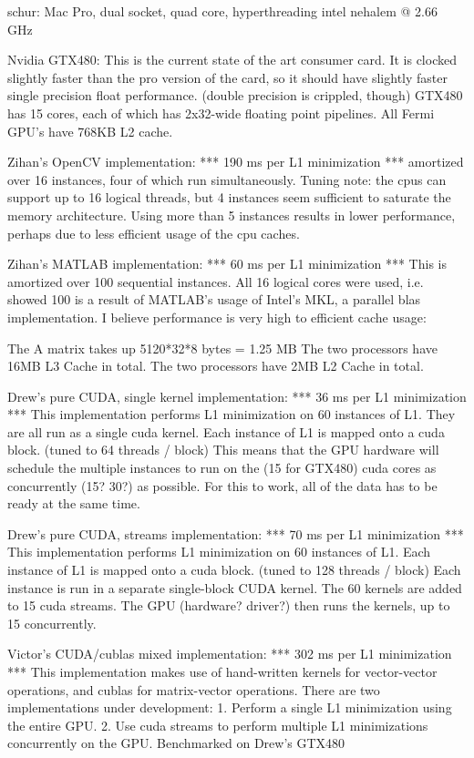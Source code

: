 \documentclass[10pt,twocolumn,letterpaper]{article}
\begin{document}
schur:  Mac Pro, dual socket, quad core, hyperthreading intel nehalem @ 2.66 GHz

Nvidia GTX480: This is the current state of the art consumer card.  
It is clocked slightly faster than the pro version of the card, so it 
should have slightly faster single precision float performance. (double precision is crippled, though)
GTX480 has 15 cores, each of which has 2x32-wide floating point pipelines.
All Fermi GPU's have 768KB L2 cache.

Zihan's OpenCV implementation: *** 190 ms per L1 minimization ***
amortized over 16 instances,
four of which run simultaneously.  Tuning note:  the cpus
can support up to 16 logical threads, but 4 instances seem
sufficient to saturate the memory architecture.  Using more
than 5 instances results in lower performance, perhaps due
to less efficient usage of the cpu caches.

Zihan's MATLAB implementation: *** 60 ms per L1 minimization ***
This is amortized over 100 sequential instances.  All 16 logical
cores were used, i.e. showed 100%
is a result of MATLAB's usage of Intel's MKL, a parallel blas
implementation. I believe performance is very high to
efficient cache usage:

The A matrix takes up 5120*32*8 bytes = 1.25 MB
The two processors have 16MB L3 Cache in total.
The two processors have 2MB L2 Cache in total.

Drew's pure CUDA, single kernel implementation: *** 36 ms per L1 minimization ***
This implementation performs L1 minimization on 60 instances of L1.
They are all run as a single cuda kernel.  
Each instance of L1 is mapped onto a cuda block. (tuned to 64 threads / block)
This means that the GPU hardware will schedule the multiple instances to run
on the (15 for GTX480) cuda cores as concurrently (15? 30?) as possible.  
For this to work, all of the data has to be ready at the same time.

Drew's pure CUDA, streams implementation: *** 70 ms per L1 minimization ***
This implementation performs L1 minimization on 60 instances of L1.
Each instance of L1 is mapped onto a cuda block. (tuned to 128 threads / block)
Each instance is run in a separate single-block CUDA kernel.
The 60 kernels are added to 15 cuda streams.
The GPU (hardware? driver?) then runs the kernels, up to 15 concurrently.

Victor's CUDA/cublas mixed implementation: *** 302 ms per L1 minimization ***
This implementation makes use of hand-written kernels for vector-vector operations,
and cublas for matrix-vector operations.  There are two implementations under development:
1. Perform a single L1 minimization using the entire GPU.
2. Use cuda streams to perform multiple L1 minimizations concurrently on the GPU.
Benchmarked on Drew's GTX480
\end{document}
